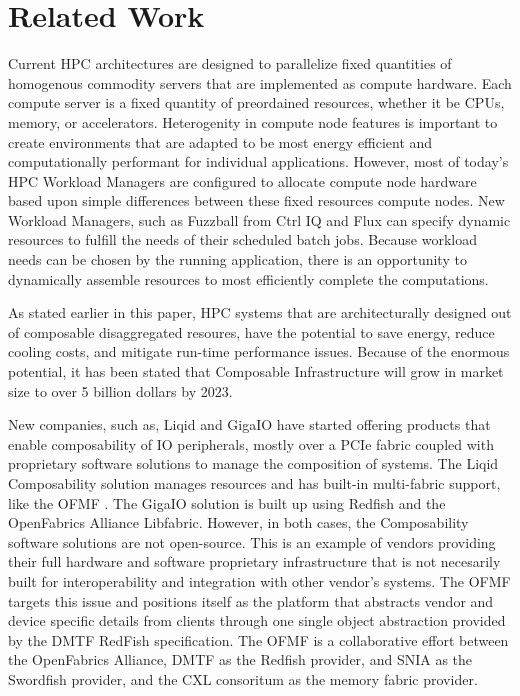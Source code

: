 \section{Related Work}
Current HPC architectures are designed to parallelize fixed quantities of homogenous commodity servers that are implemented as compute hardware.  Each compute server is a fixed quantity of preordained resources, whether it be CPUs, memory, or accelerators.  Heterogenity in compute node features is important to create environments that are adapted to be most energy efficient and computationally performant for individual applications.  However, most of today's HPC Workload Managers are configured to allocate compute node hardware based upon simple differences between these fixed resources compute nodes.  New Workload Managers, such as Fuzzball from Ctrl IQ \cite{fuzzball} and Flux \cite{flux} can specify dynamic resources to fulfill the needs of their scheduled batch jobs. Because workload needs can be chosen by the running application, there is an opportunity to dynamically assemble resources to most efficiently complete the computations.
 
As stated earlier in this paper, HPC systems that are architecturally designed out of composable disaggregated resoures, have the potential to save energy, reduce cooling costs, and mitigate run-time performance issues. Because of the enormous potential, it has been stated that Composable Infrastructure will grow in market size to over 5 billion dollars by 2023\cite{rlinker}.

New companies, such as, Liqid \cite{liqid} and GigaIO \cite{gigaio}  have started offering products that enable composability of IO peripherals, mostly over a PCIe fabric coupled with proprietary software solutions to manage the composition of systems. The Liqid Composability solution manages resources and has built-in multi-fabric support, like the OFMF \cite{liqidmf}. The GigaIO solution is built up using Redfish and the OpenFabrics Alliance Libfabric.  However, in both cases, the Composability software solutions are not open-source. This is an example of vendors providing their full hardware and software proprietary infrastructure that is not necesarily built for interoperability and integration with other vendor's systems.
The OFMF targets this issue and positions itself as the platform that abstracts vendor and device specific details from clients through one single object abstraction provided by the DMTF RedFish specification. The OFMF is a collaborative effort between the OpenFabrics Alliance, DMTF as the Redfish provider, and SNIA as the Swordfish provider, and the CXL consoritum as the memory fabric provider.








 
